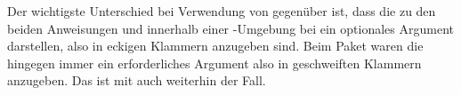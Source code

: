 \begin{Declaration}
\end{Declaration}
Der wichtigste Unterschied bei Verwendung von  gegenüber
 ist, dass die  zu den beiden Anweisungen
 und  innerhalb einer
-Umgebung bei  ein optionales Argument
darstellen, also in eckigen Klammern anzugeben sind. Beim Paket
 waren die  hingegen immer ein erforderliches
Argument also in geschweiften Klammern anzugeben. Das ist mit
 auch weiterhin der Fall.%
\EndIndexGroup
%
\EndIndexGroup


